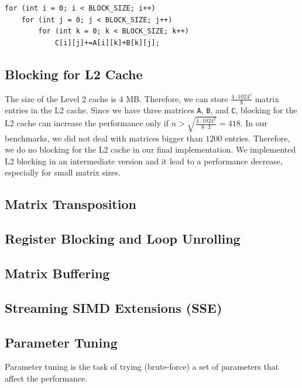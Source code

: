 \documentclass[12pt]{article}
\begin{document}
\begin{lstlisting}
for (int i = 0; i < BLOCK_SIZE; i++)
	for (int j = 0; j < BLOCK_SIZE; j++)
		for (int k = 0; k < BLOCK_SIZE; k++)
			C[i][j]+=A[i][k]+B[k][j];
\end{lstlisting}

\subsection{Blocking for L2 Cache}
The size of the Level 2 cache is $4$ MB. Therefore, we can store $\frac{4 \cdot 1024^2}{8}$ matrix entries in the L2 cache. Since we have three matrices \lstinline{A}, \lstinline{B}, and \lstinline{C}, blocking for the L2 cache can increase the performance only if $n > \sqrt{\frac{4 \cdot 1024^2}{8 \cdot 3}} = 418$. In our benchmarks, we did not deal with matrices bigger than $1200$ entries. Therefore, we do no blocking for the L2 cache in our final implementation. We implemented L2 blocking in an intermediate version and it lead to a performance decrease, especially for small matrix sizes.

\subsection{Matrix Transposition}

\subsection{Register Blocking and Loop Unrolling}

\subsection{Matrix Buffering}

\subsection{Streaming SIMD Extensions (SSE)}

\subsection{Parameter Tuning}
Parameter tuning is the task of trying (brute-force) a set of parameters that affect the performance.
\end{document}
